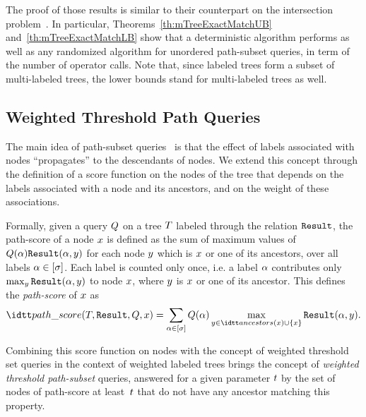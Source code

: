 The proof of those results is similar to their counterpart on the
intersection problem~\cite{adaptiveIntersectionAndTThresholdProblems}.
%
In particular, Theorems~\ref{th:mTreeExactMatchUB}
and~\ref{th:mTreeExactMatchLB} show that a deterministic algorithm
performs as well as any randomized algorithm for unordered path-subset
queries, in term of the number of operator calls.
%
Note that, since labeled trees form a subset of multi-labeled trees,
the lower bounds stand for multi-labeled trees as well.



\subsection{Weighted Threshold Path Queries~\cite{adaptiveAlgorithmsForWeightedQueriesOnWeightedBinaryRelationsAndLabeledTrees}}
\label{sec:thresh-path-quer}



The main idea of path-subset
queries~\cite{adaptiveSearchingInSuccinctlyEncodedBinaryRelationsAndTreeStructuredDocuments}
is that the effect of labels associated with nodes ``propagates'' to the descendants of nodes.
%
We extend this concept through the definition of a score function on
the nodes of the tree that depends on the labels associated with a
node and its ancestors, and on the weight of these associations.

Formally, given a query $Q$ on a tree $T$ labeled through the
relation $\hbox{\tt Result}$, the path-score of a node $x$ is defined as the sum
of maximum values of $Q(\alpha)\hbox{\tt Result}(\alpha,y)$ for each node
$y$ which is $x$ or one of its ancestors, over all labels
$\alpha \in [\sigma]$.
%
Each label is
counted only once, i.e. a label $\alpha$ contributes only
$\max_{y}{\hbox{\tt Result}(\alpha,y)}$ to node $x$, where
$y$ is $x$ or one of its ancestor.
%
This defines the {\em path-score} of $x$ as 
$$\pathscore(\tree,\R,\Q,\nodex)= \sum_{\labelx\in[\nblabels]}
\Q(\labelx) \max_{\nodey \in \ancestors(x) \cup
  \{\nodex\}}{\R(\labelx,\nodey)}.$$


Combining this score function on nodes with the concept of weighted
threshold set queries in the context of weighted labeled trees brings 
the concept of {\em weighted threshold path-subset} queries, answered
for a given parameter $t$ by the set of nodes of path-score at
least~$t$ that do not have any ancestor matching this
property.

